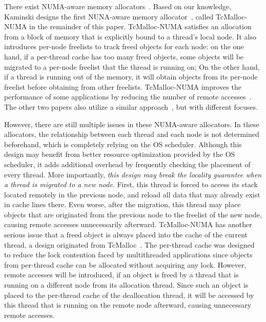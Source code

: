 There exist NUMA-aware memory allocators~\cite{tcmallocnew, kim2013node, yang2019jarena}. Based on our knowledge, Kaminski designs the first NUNA-aware memory allocator~\cite{tcmallocnew}, called  TcMalloc-NUMA in the remainder of this paper.  TcMalloc-NUMA satisfies an allocation from a block of memory that is explicitly bound to a thread's local node. It also introduces per-node freelists to track freed objects for each node: on the one hand, if a per-thread cache has too many freed objects, some objects will be migrated to a per-node freelist that the thread is running on; On the other hand, if a thread is running out of the memory, it will obtain objects from its per-node freelist before obtaining from other freelists. TcMalloc-NUMA improves the performance of some applications by reducing the number of remote accesses~\cite{tcmallocnew}.  The other two papers also utilize a similar approach~\cite{kim2013node, yang2019jarena},  but with different focuses.

 

However, there are still multiple issues in these NUMA-aware allocators. In these allocators, the relationship between each thread and each node is not determined beforehand, which is completely relying on the OS scheduler. Although this design may benefit from better resource optimization provided by the OS scheduler, it adds additional overhead by frequently checking the placement of every thread. More importantly, \textit{this design may break the locality guarantee when a thread is migrated to a new node}. First, this thread is forced to access its stack located remotely in the previous node, and reload all data that may already exist in cache lines there. Even worse, after the migration, this thread may  place objects that are originated from the previous node to the freelist of the new node, causing remote accesses unnecessarily afterward.  TcMalloc-NUMA has another serious issue that a freed object is always placed into the cache of the current thread, a design originated from TcMalloc~\cite{tcmalloc}.  The per-thread cache was designed to reduce the lock contention faced by multithreaded applications since objects from per-thread cache can be allocated without acquiring any lock. However, remote accesses will be introduced, if an object is freed by a thread that is running on a different node from its allocation thread. Since such an object is placed to the per-thread cache of the deallocation thread, it will be accessed by this thread that is running on the remote node afterward, causing unnecessary remote accesses. 


